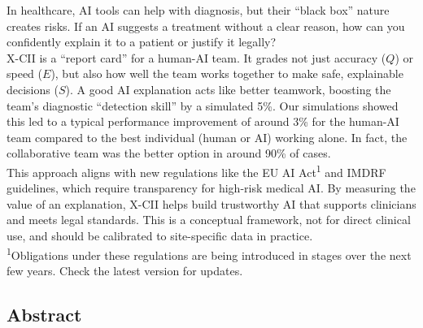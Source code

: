 \documentclass[a4paper]{article}
\begin{document}
In healthcare, AI tools can help with diagnosis, but their ``black box''
nature creates risks. If an AI suggests a treatment without a clear
reason, how can you confidently explain it to a patient or justify it
legally?\\
X-CII is a ``report card'' for a human-AI team. It grades not just
accuracy ($Q$) or speed ($E$), but also how well the team works together to
make safe, explainable decisions ($S$). A good AI explanation acts like
better teamwork, boosting the team's diagnostic ``detection skill'' by a
simulated 5\%. Our simulations showed this led to a typical performance
improvement of around 3\% for the human-AI team compared to the best
individual (human or AI) working alone. In fact, the collaborative team
was the better option in around 90\% of cases.\\
This approach aligns with new regulations like the EU AI Act\textsuperscript{1} and IMDRF
guidelines, which require transparency for high-risk medical AI. By
measuring the value of an explanation, X-CII helps build trustworthy AI
that supports clinicians and meets legal standards. This is a conceptual
framework, not for direct clinical use, and should be calibrated to
site-specific data in practice.\\
\textsuperscript{1}Obligations under these regulations are being introduced in stages over
the next few years. Check the latest version for updates.

\subsection{Abstract}\label{abstract}
\end{document}
